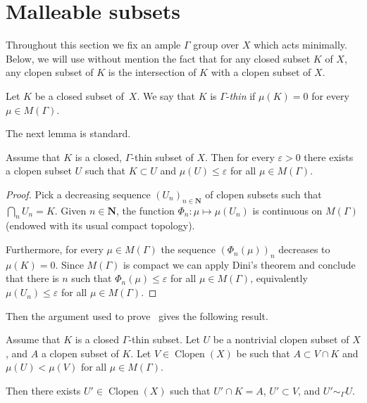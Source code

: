 \documentclass[AHL,Unicode]{cedram}
\DeclareMathOperator{\Clopen}{Clopen}
\newcommand{\N}{\mathbf{N}}
\begin{document}
\section{Malleable subsets}

Throughout this section we fix an ample $\Gamma$ group over $X$ which acts minimally. Below, we will use without mention the fact that for any closed subset $K$ of $X$, any clopen subset of $K$ is the intersection of $K$ with a clopen subset of $X$.

\begin{defi}
Let $K$ be a closed subset of~$X$. We say that $K$ is $\Gamma$-\emph{thin} if $\mu(K)=0$ for every $\mu \in M(\Gamma)$.
\end{defi}

The next lemma is standard.

\begin{lemm}\label{l:small_clopen}
Assume that $K$ is a closed, $\Gamma$-thin subset of $X$. Then for every $\varepsilon >0$ there exists a clopen subset $U$ such that $K \subset U$ and $\mu(U) \le \varepsilon$ for all $\mu \in M(\Gamma)$.
\end{lemm}

\begin{proof}
Pick a decreasing sequence $(U_n)_{n \in \N}$ of clopen subsets such that\linebreak ${\bigcap_n U_n = K}$. Given $n \in \N$, the function $\Phi_n \colon \mu \mapsto \mu(U_n)$ is continuous on $M(\Gamma)$ (endowed with its usual compact topology).

Furthermore, for every $\mu \in M(\Gamma)$ the sequence $(\Phi_n(\mu))_n$ decreases to $\mu(K)=0$. Since $M(\Gamma)$ is compact we can apply Dini's theorem and conclude that there is $n$ such that $\Phi_n(\mu) \le \varepsilon$ for all $\mu \in M(\Gamma)$, equivalently $\mu(U_n) \le \varepsilon$ for all $\mu \in M(\Gamma)$.
\end{proof}

Then the argument used to prove~\cite[Lemma~3.13]{Melleray2023} gives the following result.

\begin{lemm}\label{l:compatible_clopen}
Assume that $K$ is a closed $\Gamma$-thin subset. Let $U$ be a nontrivial clopen subset of $X$, and $A$ a clopen subset of $K$. Let $V \in \Clopen(X)$ be such that $A \subset V \cap K$ and $\mu(U)< \mu(V)$ for all $\mu \in M(\Gamma)$.

Then there exists $U' \in \Clopen(X)$ such that $U' \cap K =A$, $U' \subset V$, and $U' \sim_\Gamma U$.
\end{lemm}
\end{document}
